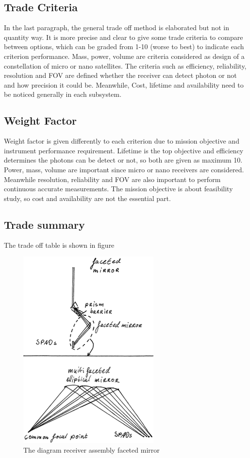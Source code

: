 \subsection{Trade Criteria}
\label{TOReceiverC}
In the last paragraph, the general trade off method is elaborated but not in quantity way. It is more precise and clear to give some trade criteria to compare between options, which can be graded from 1-10 (worse to best) to indicate each criterion performance. Mass, power, volume are criteria considered as design of a constellation of micro or nano satellites. The criteria such as efficiency, reliability, resolution and \ac{FOV} are defined whether the receiver can detect photon or not and how precision it could be. Meanwhile, Cost, lifetime and availability need to be noticed generally in each subsystem.

\subsection{Weight Factor}
\label{TOReceiverWF}
Weight factor is given differently to each criterion due to mission objective and instrument performance requirement. Lifetime is the top objective and efficiency determines the photons can be detect or not, so both are given as maximum 10. Power, mass, volume are important since micro or nano receivers are considered. Meanwhile resolution, reliability and \acs{FOV} are also important to perform continuous accurate measurements. The mission objective is about feasibility study, so cost and availability are not the essential part.

\subsection{Trade summary}
\label{TOReceiverS}
The trade off table is shown in figure
\begin{figure}
\centering
\includegraphics[scale = 0.6]{chapters/img/DiagramReceiverAssemblyFacetedMirror.png}
\caption{The diagram receiver assembly faceted mirror}
\label{fig:diagram_Rfaceted mirror}
\end{figure}
